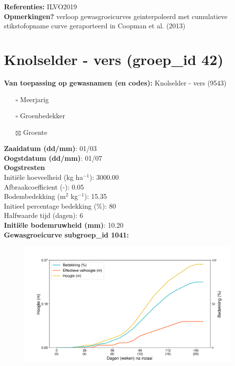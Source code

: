\documentclass{article}
\begin{document}
  \textbf{Referenties:} ILVO2019 \vspace{0.10cm} \\ 
  \textbf{Opmerkingen?} verloop gewasgroeicurves geinterpoleerd met cumulatieve stikstofopname curve geraporteerd in Coopman et al. (2013) \vspace{0.10cm} \\ 
 \newpage 
 \section{Knolselder - vers (groep\_id 42)} 
 \textbf{Van toepassing op gewasnamen (en codes):} Knolselder - vers (9543) 
 \begin{multicols}{3} \begin{itemize} \item[$\square$] Meerjarig \item[$\square$] Groenbedekker \item[$\boxtimes$] Groente \end{itemize} \end{multicols} 
  \textbf{Zaaidatum (dd/mm)}: 01/03  \vspace{0.10cm} \\ 
  \textbf{Oogstdatum (dd/mm)}: 01/07  \vspace{0.10cm} \\ 
  \textbf{Oogstresten} \vspace{0.05cm} \\ 
  \tab Initi\"{e}le hoeveelheid (kg ha$^{-1}$): 3000.00 \vspace{0.05cm} \\ 
  \tab Afbraakcoefficient (-): 0.05 \vspace{0.05cm} \\ 
  \tab Bodembedekking (m$^2$ kg$^{-1}$): 15.35 \vspace{0.05cm} \\ 
  \tab Initieel percentage bedekking (\%): 80 \vspace{0.05cm} \\ 
  \tab Halfwaarde tijd (dagen): 6 \vspace{0.05cm} \\ 
  \textbf{Initi\"{e}le bodemruwheid (mm)}: 10.20 \vspace{0.05cm} \\ 
  \textbf{Gewasgroeicurve subgroep\_id 1041:} 
 \begin{center} \begin{figure}[H] \includegraphics[width=12.5cm]{temp/1041.png} \end{figure} \end{center} 
\end{document}
